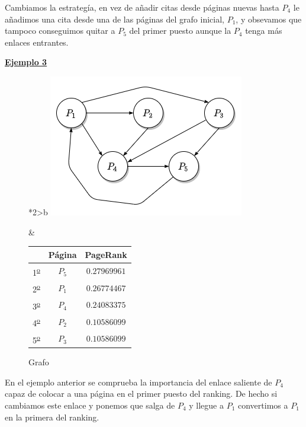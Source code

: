 \documentclass[size=a4, parskip=half, titlepage=false, toc=flat, toc=bib, 12pt]{scrartcl}
\theoremstyle{theorem-style}
\theoremstyle{definition-style}
\theoremstyle{remark-style}
\theoremstyle{example-style}
\theoremstyle{definition-style}
\theoremstyle{remark-style}
\begin{document}
\newpage

Cambiamos la estrategía, en vez de añadir citas desde páginas nuevas hasta $P_4$ le añadimos una cita desde una de las páginas del grafo inicial, $P_1$, y obsevamos que tampoco conseguimos quitar a $P_5$ del primer puesto aunque la $P_4$ tenga más enlaces entrantes.

\underline{\textbf{Ejemplo 3}}

\begin{figure}[!ht]
  \begin{tabular}{*{2}{>{\centering\arraybackslash}b{}}}
  \centering
    \includegraphics[scale=0.5]{./img/grafoej3}
    \caption{Grafo}
    &
      \renewcommand{\arraystretch}{1.3}
      \begin{tabular}{ccc}
        & Página & PageRank     \\ \hline
      1\textsuperscript{\underline{o}}} & $P_5$  & $0.27969961$ \\ \hline
      2\textsuperscript{\underline{o}}} & $P_1$  & $0.26774467$ \\ \hline
      3\textsuperscript{\underline{o}}} & $P_4$  & $0.24083375$ \\ \hline
      4\textsuperscript{\underline{o}}} & $P_2$  & $0.10586099$ \\ \hline
      5\textsuperscript{\underline{o}}} & $P_3$  & $0.10586099$ \\ \hline
      \end{tabular}
    \end{tabular}
\end{figure}

En el ejemplo anterior se comprueba la importancia del enlace saliente de $P_4$ capaz de colocar a una página en el primer puesto del ranking. De hecho si cambiamos este enlace y ponemos que salga de $P_4$ y llegue a $P_1$ convertimos a $P_1$ en la primera del ranking.
\end{document}
